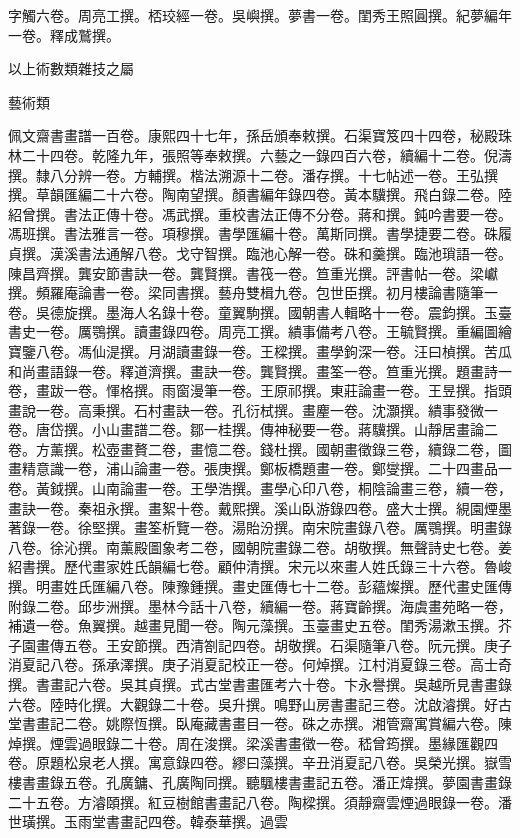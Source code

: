 \begin{pinyinscope}
字觸六卷。周亮工撰。桮珓經一卷。吳嶼撰。夢書一卷。閨秀王照圓撰。紀夢編年一卷。釋成鷲撰。

以上術數類雜技之屬

藝術類

佩文齋書畫譜一百卷。康熙四十七年，孫岳頒奉敕撰。石渠寶笈四十四卷，秘殿珠林二十四卷。乾隆九年，張照等奉敕撰。六藝之一錄四百六卷，續編十二卷。倪濤撰。隸八分辨一卷。方輔撰。楷法溯源十二卷。潘存撰。十七帖述一卷。王弘撰撰。草韻匯編二十六卷。陶南望撰。顏書編年錄四卷。黃本驥撰。飛白錄二卷。陸紹曾撰。書法正傳十卷。馮武撰。重校書法正傳不分卷。蔣和撰。鈍吟書要一卷。馮班撰。書法雅言一卷。項穆撰。書學匯編十卷。萬斯同撰。書學捷要二卷。硃履貞撰。漢溪書法通解八卷。戈守智撰。臨池心解一卷。硃和羹撰。臨池瑣語一卷。陳昌齊撰。龔安節書訣一卷。龔賢撰。書筏一卷。笪重光撰。評書帖一卷。梁巘撰。頻羅庵論書一卷。梁同書撰。藝舟雙楫九卷。包世臣撰。初月樓論書隨筆一卷。吳德旋撰。墨海人名錄十卷。童翼駒撰。國朝書人輯略十一卷。震鈞撰。玉臺書史一卷。厲鶚撰。讀畫錄四卷。周亮工撰。繢事備考八卷。王毓賢撰。重編圖繪寶鑒八卷。馮仙湜撰。月湖讀畫錄一卷。王樑撰。畫學鉤深一卷。汪曰楨撰。苦瓜和尚畫語錄一卷。釋道濟撰。畫訣一卷。龔賢撰。畫筌一卷。笪重光撰。題畫詩一卷，畫跋一卷。惲格撰。雨窗漫筆一卷。王原祁撰。東莊論畫一卷。王昱撰。指頭畫說一卷。高秉撰。石村畫訣一卷。孔衍栻撰。畫麈一卷。沈灝撰。繢事發微一卷。唐岱撰。小山畫譜二卷。鄒一桂撰。傳神秘要一卷。蔣驥撰。山靜居畫論二卷。方薰撰。松壺畫贅二卷，畫憶二卷。錢杜撰。國朝畫徵錄三卷，續錄二卷，圖畫精意識一卷，浦山論畫一卷。張庚撰。鄭板橋題畫一卷。鄭燮撰。二十四畫品一卷。黃鉞撰。山南論畫一卷。王學浩撰。畫學心印八卷，桐陰論畫三卷，續一卷，畫訣一卷。秦祖永撰。畫絮十卷。戴熙撰。溪山臥游錄四卷。盛大士撰。絸園煙墨著錄一卷。徐堅撰。畫筌析覽一卷。湯貽汾撰。南宋院畫錄八卷。厲鶚撰。明畫錄八卷。徐沁撰。南薰殿圖象考二卷，國朝院畫錄二卷。胡敬撰。無聲詩史七卷。姜紹書撰。歷代畫家姓氏韻編七卷。顧仲清撰。宋元以來畫人姓氏錄三十六卷。魯峻撰。明畫姓氏匯編八卷。陳豫鍾撰。畫史匯傳七十二卷。彭蘊燦撰。歷代畫史匯傳附錄二卷。邱步洲撰。墨林今話十八卷，續編一卷。蔣寶齡撰。海虞畫苑略一卷，補遺一卷。魚翼撰。越畫見聞一卷。陶元藻撰。玉臺畫史五卷。閨秀湯漱玉撰。芥子園畫傳五卷。王安節撰。西清劄記四卷。胡敬撰。石渠隨筆八卷。阮元撰。庚子消夏記八卷。孫承澤撰。庚子消夏記校正一卷。何焯撰。江村消夏錄三卷。高士奇撰。書畫記六卷。吳其貞撰。式古堂書畫匯考六十卷。卞永譽撰。吳越所見書畫錄六卷。陸時化撰。大觀錄二十卷。吳升撰。鳴野山房書畫記三卷。沈啟濬撰。好古堂書畫記二卷。姚際恆撰。臥庵藏書畫目一卷。硃之赤撰。湘管齋寓賞編六卷。陳焯撰。煙雲過眼錄二十卷。周在浚撰。梁溪書畫徵一卷。嵇曾筠撰。墨緣匯觀四卷。原題松泉老人撰。寓意錄四卷。繆曰藻撰。辛丑消夏記八卷。吳榮光撰。嶽雪樓書畫錄五卷。孔廣鏞、孔廣陶同撰。聽颿樓書畫記五卷。潘正煒撰。夢園書畫錄二十五卷。方濬頤撰。紅豆樹館書畫記八卷。陶樑撰。須靜齋雲煙過眼錄一卷。潘世璜撰。玉雨堂書畫記四卷。韓泰華撰。過雲
\end{pinyinscope}
